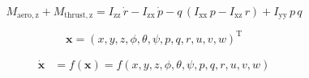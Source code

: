 \documentclass[lettersize,journal]{IEEEtran}
\begin{document}
{\begin{equation}
M_{\mathrm{aero,z}}+M_{\mathrm{thrust,z}}=I_{\mathrm{zz}}\,\dot{r}-I_{\mathrm{zx}}\,\dot{p}-q\,\left(I_{\mathrm{xx}}\,p-I_{\mathrm{xz}}\,r\right)+I_{\mathrm{yy}}\,p\,q
\end{equation}

\begin{equation}
\bm{x}=(x, y, z, \phi, \theta, \psi, p, q, r, u, v, w)^{\mathrm{T}}
\end{equation}

\begin{equation}
\begin{aligned}
\bm{\dot{x}}&=f\left(\bm{x}\right)=f\left(x, y, z, \phi, \theta, \psi, p, q, r, u, v, w\right)
\end{aligned}
\end{equation}

}
\end{document}
